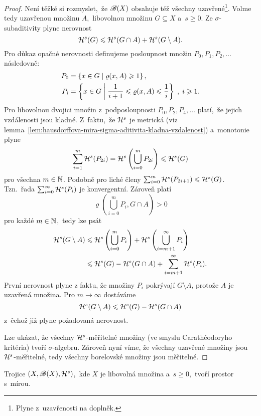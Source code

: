 \begin{proof}
    Není těžké si rozmyslet,~že $\mathscr{B}(X)$ obsahuje též všechny uzavřené\footnote{Plyne z~uzavřenosti na doplněk.}. Volme tedy uzavřenou množinu $A$,~libovolnou množinu $G\subseteq X$ a~$s\geqslant 0$. Ze $\sigma$-subaditivity plyne nerovnost
    \[\mathcal{H}^{s}(G)\leqslant\mathcal{H}^{s}(G\cap A)+\mathcal{H}^{s}(G\setminus A).\]
    Pro důkaz opačné nerovnosti definujeme posloupnost množin $P_0,P_1,P_2,\ldots$ následovně:
    \begin{align*}
        P_0&=\left\{x\in G\mid\varrho(x,A)\geqslant 1\right\},\\
        P_i&=\left\{x\in G\;\middle|\;\dfrac{1}{i+1}\leqslant\varrho(x,A)\leqslant\dfrac{1}{i}\right\}\;,\;i\geqslant 1.
    \end{align*}
    Pro libovolnou dvojici množin z~podposloupnosti $P_0,P_2,P_4,\ldots$ platí,~že jejich vzdálenosti jsou kladné. Z~faktu,~že $\mathcal{H}^{s}$ je metrická (viz lemma~\ref{lem:hausdorffova-mira-sigma-aditivita-kladna-vzdalenost}) a~monotonie plyne
    \[\sum_{i=1}^{m}\mathcal{H}^{s}(P_{2i})=\mathcal{H}^{s}\left(\bigcup_{i=0}^m P_{2i}\right)\leqslant\mathcal{H}^{s}(G)\]
    pro všechna $m\in\mathbb{N}$. Podobně pro liché členy $\sum_{i=0}^{m}\mathcal{H}^{s}(P_{2i+1})\leqslant\mathcal{H}^{s}(G)$. Tzn.~řada $\sum_{i=0}^{\infty}\mathcal{H}^{s}(P_i)$ je konvergentní. Zároveň platí
    \[\varrho\left(\bigcup_{i=0}^m P_i,G\cap A\right)>0\]
    pro každé $m\in\mathbb{N}$,~tedy lze psát
    \begin{align*}
        \mathcal{H}^{s}(G\setminus A)&\leqslant\mathcal{H}^{s}\left(\bigcup_{i=0}^m P_i\right)+\mathcal{H}^{s}\left(\bigcup_{i=m+1}^\infty P_i\right)\\
        &\leqslant\mathcal{H}^{s}(G)-\mathcal{H}^{s}(G\cap A)+\sum_{i=m+1}^{\infty}\mathcal{H}^{s}(P_i).
    \end{align*}
    První nerovnost plyne z faktu, že množiny $P_i$ pokrývají $G\setminus A$, protože $A$ je uzavřená množina. Pro $m\to\infty$ dostáváme
    \[\mathcal{H}^{s}(G\setminus A)\leqslant\mathcal{H}^{s}(G)-\mathcal{H}^{s}(G\cap A)\]
    z~čehož již plyne požadovaná nerovnost.

    Lze ukázat, že všechny $\mathcal{H}^{s}$-měřitelné množiny (ve smyslu Carathéodoryho kritéria) tvoří $\sigma$-algebru. Zároveň nyní víme, že všechny uzavřené množiny jsou $\mathcal{H}^{s}$-měřitelné, tedy všechny borelovské množiny jsou měřitelné. 
\end{proof}
\begin{corollary}\label{cor:hausdorffova-mira-je-mira}
    Trojice $(X,\mathscr{B}(X),\mathcal{H}^{s})$,~kde $X$ je libovolná množina a~$s\geqslant 0$,~tvoří prostor s~mírou.
\end{corollary}

